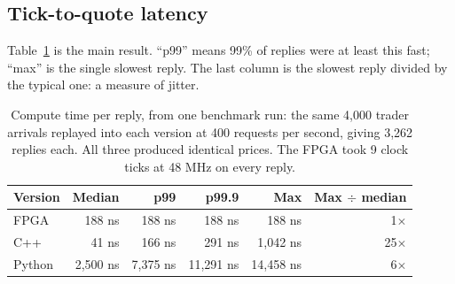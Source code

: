 \documentclass[11pt]{article}
\begin{document}
\subsection{Tick-to-quote latency}

Table~\ref{tab:latency} is the main result. ``p99'' means 99\% of replies were
at least this fast; ``max'' is the single slowest reply. The last column is
the slowest reply divided by the typical one: a measure of jitter.

\begin{table}[h]
\centering
\begin{tabular}{lrrrrr}
\toprule
Version & Median & p99 & p99.9 & Max & Max $\div$ median \\
\midrule
FPGA   & 188 ns     & 188 ns     & 188 ns     & 188 ns     & 1$\times$ \\
C++    & 41 ns      & 166 ns     & 291 ns     & 1{,}042 ns & 25$\times$ \\
Python & 2{,}500 ns & 7{,}375 ns & 11{,}291 ns & 14{,}458 ns & 6$\times$ \\
\bottomrule
\end{tabular}
\caption{Compute time per reply, from one benchmark run: the same 4{,}000
trader arrivals replayed into each version at 400 requests per second, giving
3{,}262 replies each. All three produced identical prices. The FPGA took 9
clock ticks at 48 MHz on every reply.}
\label{tab:latency}
\end{table}
\end{document}
